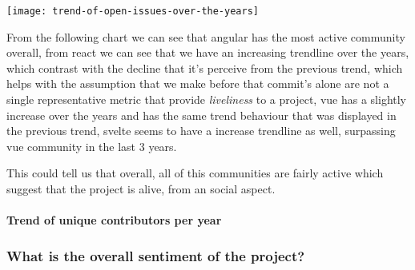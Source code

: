 \begin{center}
    \texttt{[image: trend-of-open-issues-over-the-years]}    
\end{center}

From the following chart we can see that angular has the most active community overall, from react we can see that we have an increasing trendline over the years, which contrast with the decline that it's perceive from the previous trend, which helps with the assumption that we make before that commit's alone are not a single representative metric that provide \textit{liveliness} to a project, vue has a slightly increase over the years and has the same trend behaviour that was displayed in the previous trend, svelte seems to have a increase trendline as well, surpassing vue community in the last 3 years.

This could tell us that overall, all of this communities are fairly active which suggest that the project is alive, from an social aspect.




\paragraph{Trend of unique contributors per year}


\subsubsection{What is the overall sentiment of the project?}
